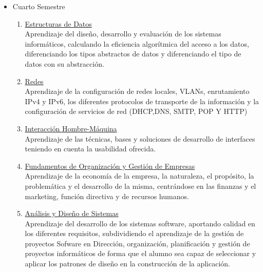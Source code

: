 \begin{itemize}
\item Cuarto Semestre
\begin{enumerate}[resume]
\item \underline{Estructuras de Datos}\\Aprendizaje del diseño, desarrollo y evaluación de los sistemas informáticos, calculando la eficiencia algorítmica del acceso a los datos, diferenciando los tipos abstractos de datos y diferenciando el tipo de datos con su abstracción. 
\item \underline{Redes}\\Aprendizaje de la configuración de redes locales, VLANs, enrutamiento IPv4 y IPv6, los diferentes protocolos de transporte de la información y la configuración de servicios de red (DHCP,DNS, SMTP, POP Y HTTP)
\item \underline{Interacción Hombre-Máquina}\\Aprendizaje de las técnicas, bases y soluciones de desarrollo de interfaces teniendo en cuenta la usabilidad ofrecida. 
\item \underline{Fundamentos de Organización y Gestión de Empresas}\\Aprendizaje de la economía de la empresa, la naturaleza, el propósito, la problemática y el desarrollo de la misma, centrándose en las finanzas y el marketing, función directiva y de recursos humanos. 
\item \underline{Análisis y Diseño de Sistemas}\\Aprendizaje del desarrollo de los sistemas software, aportando calidad en los diferentes requisitos, subdividiendo el aprendizaje de la gestión de proyectos Sofware en Dirección, organización, planificación y gestión de proyectos informáticos  de forma que el alumno sea capaz de seleccionar y aplicar los patrones de diseño en la construcción de la aplicación.
\end{enumerate}
\end{itemize}
